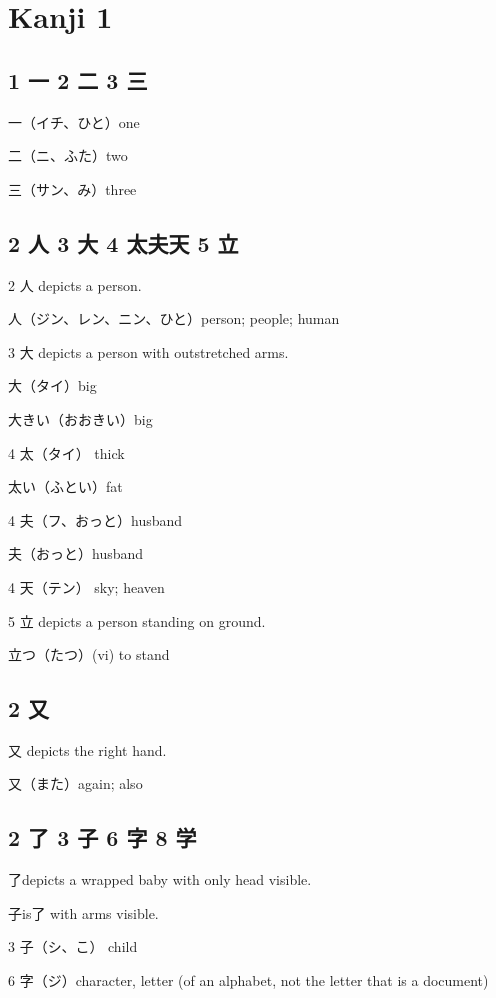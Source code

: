 \chapter{Kanji 1}

\section{1 一 2 二 3 三}

一（イチ、ひと）one

二（ニ、ふた）two

三（サン、み）three

\section{2 人 3 大 4 太夫天 5 立}

2 人 depicts a person.

人（ジン、レン、ニン、ひと）person; people; human

3 大 depicts a person with outstretched arms.

大（タイ）big

大きい（おおきい）big

4 太（タイ） thick

太い（ふとい）fat

4 夫（フ、おっと）husband

夫（おっと）husband

4 天（テン） sky; heaven

5 立 depicts a person standing on ground.

立つ（たつ）(vi) to stand

\section{2 又}

又 depicts the right hand.

又（また）again; also

\section{2 了 3 子 6 字 8 学}

了depicts a wrapped baby with only head visible.

子is了 with arms visible.

3 子（シ、こ） child

6 字（ジ）character, letter (of an alphabet, not the letter that is a document)

